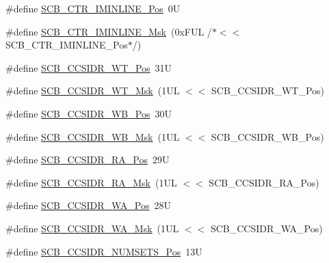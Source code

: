 \begin{DoxyCompactItemize}
\item 
\#define \mbox{\hyperlink{group___c_m_s_i_s___s_c_b_ga5be00464e6789da9619947d67d2a1529}{S\+C\+B\+\_\+\+C\+T\+R\+\_\+\+I\+M\+I\+N\+L\+I\+N\+E\+\_\+\+Pos}}~0U
\item 
\#define \mbox{\hyperlink{group___c_m_s_i_s___s_c_b_gac62440e20c39b8022279a4a706ef9aa3}{S\+C\+B\+\_\+\+C\+T\+R\+\_\+\+I\+M\+I\+N\+L\+I\+N\+E\+\_\+\+Msk}}~(0x\+F\+U\+L /$\ast$$<$$<$ S\+C\+B\+\_\+\+C\+T\+R\+\_\+\+I\+M\+I\+N\+L\+I\+N\+E\+\_\+\+Pos$\ast$/)
\item 
\#define \mbox{\hyperlink{group___c_m_s_i_s___s_c_b_ga4eaf5ef29d920023de2cf53b25d0d56c}{S\+C\+B\+\_\+\+C\+C\+S\+I\+D\+R\+\_\+\+W\+T\+\_\+\+Pos}}~31U
\item 
\#define \mbox{\hyperlink{group___c_m_s_i_s___s_c_b_ga9089551a75985fa7cf051062ed2d62b9}{S\+C\+B\+\_\+\+C\+C\+S\+I\+D\+R\+\_\+\+W\+T\+\_\+\+Msk}}~(1\+U\+L $<$$<$ S\+C\+B\+\_\+\+C\+C\+S\+I\+D\+R\+\_\+\+W\+T\+\_\+\+Pos)
\item 
\#define \mbox{\hyperlink{group___c_m_s_i_s___s_c_b_ga4a32c31034cf30f6fe4dfaa9d0d6a6af}{S\+C\+B\+\_\+\+C\+C\+S\+I\+D\+R\+\_\+\+W\+B\+\_\+\+Pos}}~30U
\item 
\#define \mbox{\hyperlink{group___c_m_s_i_s___s_c_b_gaa9c0516faf8b9c7ab4151823c48f39b6}{S\+C\+B\+\_\+\+C\+C\+S\+I\+D\+R\+\_\+\+W\+B\+\_\+\+Msk}}~(1\+U\+L $<$$<$ S\+C\+B\+\_\+\+C\+C\+S\+I\+D\+R\+\_\+\+W\+B\+\_\+\+Pos)
\item 
\#define \mbox{\hyperlink{group___c_m_s_i_s___s_c_b_ga379743eea011cede0032ecb7812b51e1}{S\+C\+B\+\_\+\+C\+C\+S\+I\+D\+R\+\_\+\+R\+A\+\_\+\+Pos}}~29U
\item 
\#define \mbox{\hyperlink{group___c_m_s_i_s___s_c_b_gaa77f28cbf94b44c1114a66e05cc43255}{S\+C\+B\+\_\+\+C\+C\+S\+I\+D\+R\+\_\+\+R\+A\+\_\+\+Msk}}~(1\+U\+L $<$$<$ S\+C\+B\+\_\+\+C\+C\+S\+I\+D\+R\+\_\+\+R\+A\+\_\+\+Pos)
\item 
\#define \mbox{\hyperlink{group___c_m_s_i_s___s_c_b_gade432ae0a64858e92fa35c2983fb47a4}{S\+C\+B\+\_\+\+C\+C\+S\+I\+D\+R\+\_\+\+W\+A\+\_\+\+Pos}}~28U
\item 
\#define \mbox{\hyperlink{group___c_m_s_i_s___s_c_b_ga519ebde5ad64be2098f586bddbc8e898}{S\+C\+B\+\_\+\+C\+C\+S\+I\+D\+R\+\_\+\+W\+A\+\_\+\+Msk}}~(1\+U\+L $<$$<$ S\+C\+B\+\_\+\+C\+C\+S\+I\+D\+R\+\_\+\+W\+A\+\_\+\+Pos)
\item 
\#define \mbox{\hyperlink{group___c_m_s_i_s___s_c_b_ga1028d2c238f74d2aa021f53ffbe8d7ab}{S\+C\+B\+\_\+\+C\+C\+S\+I\+D\+R\+\_\+\+N\+U\+M\+S\+E\+T\+S\+\_\+\+Pos}}~13U
\item 

\end{DoxyCompactItemize}
